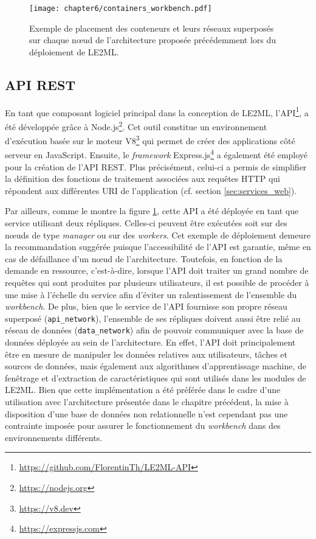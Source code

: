 \begin{figure}[H]
	\centering
	\texttt{[image: chapter6/containers\_workbench.pdf]}
        \caption{Exemple de placement des conteneurs et leurs réseaux superposés sur chaque n\oe{}ud de l'architecture proposée précédemment lors du déploiement de \acs{LE2ML}.}
	\label{fig:containers_workbench}
\end{figure}

\subsection{\acs{API} \acs{REST}}

En tant que composant logiciel principal dans la conception de \acs{LE2ML}, l'\acs{API}\footnote{\url{https://github.com/FlorentinTh/LE2ML-API}}, a été développée grâce à Node.js\footnote{\url{https://nodejs.org}}. Cet outil constitue un environnement d'exécution basée sur le moteur V8\footnote{\url{https://v8.dev}} qui permet de créer des applications côté serveur en JavaScript. Ensuite, le \textit{framework} Express.js\footnote{\url{https://expressjs.com}} a également été employé pour la création de l'\acs{API} \acs{REST}. Plus précisément, celui-ci a permis de simplifier la définition des fonctions de traitement associées aux requêtes \acs{HTTP} qui répondent aux différentes \acs{URI} de l'application (cf. section \ref{sec:services_web}).

Par ailleurs, comme le montre la figure \ref{fig:containers_workbench}, cette \acs{API} a été déployée en tant que service utilisant deux répliques. Celles-ci peuvent être exécutées soit sur des n\oe{}uds de type \textit{manager} ou sur des \textit{workers}. Cet exemple de déploiement demeure la recommandation suggérée puisque l'accessibilité de l'\acs{API} est garantie, même en cas de défaillance d'un n\oe{}ud de l'architecture. Toutefois, en fonction de la demande en ressource, c'est-à-dire, lorsque l'\acs{API} doit traiter un grand nombre de requêtes qui sont produites par plusieurs utilisateurs, il est possible de procéder à une mise à l'échelle du service afin d'éviter un ralentissement de l'ensemble du \textit{workbench}. De plus, bien que le service de l'\acs{API} fournisse son propre réseau superposé (\texttt{api\_network}), l'ensemble de ses répliques doivent aussi être relié au réseau de données (\texttt{data\_network}) afin de pouvoir communiquer avec la base de données déployée au sein de l'architecture. En effet, l'\acs{API} doit principalement être en mesure de manipuler les données relatives aux utilisateurs, tâches et sources de données, mais également aux algorithmes d'apprentissage machine, de fenêtrage et d'extraction de caractéristiques qui sont utilisés dans les modules de \acs{LE2ML}. Bien que cette implémentation a été préférée dans le cadre d'une utilisation avec l'architecture présentée dans le chapitre précédent, la mise à disposition d'une base de données non relationnelle n'est cependant pas une contrainte imposée pour assurer le fonctionnement du \textit{workbench} dans des environnements différents.

